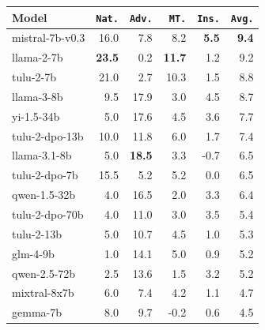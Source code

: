\documentclass[11pt]{article}
\newcommand{\natshort}{\texttt{Nat.}\xspace}
\newcommand{\advshort}{\texttt{Adv.}\xspace}
\newcommand{\mtshort}{\texttt{MT.}\xspace}
\newcommand{\insshort}{\texttt{Ins.}\xspace}
\begin{document}
\begin{table}[t!]
\small
\centering
\addtolength{\tabcolsep}{1pt} 
\begin{tabular}{@{}lrrrrr@{}}
\toprule
\textbf{Model} & \textbf{\natshort} & \textbf{\advshort} & \textbf{\mtshort}  & \textbf{\insshort} & \textbf{\texttt{Avg.}}\\
\midrule
 mistral-7b-v0.3 & 16.0             & 7.8                  & 8.2           & \textbf{5.5}    & \textbf{9.4} \\
 llama-2-7b      & \textbf{23.5}    & 0.2                  & \textbf{11.7} & 1.2             & 9.2          \\
 tulu-2-7b       & 21.0             & 2.7                  & 10.3          & 1.5             & 8.8          \\
 llama-3-8b      & 9.5              & 17.9                 & 3.0           & 4.5             & 8.7          \\
 yi-1.5-34b      & 5.0              & 17.6                 & 4.5           & 3.6             & 7.7          \\
 tulu-2-dpo-13b  & 10.0             & 11.8                 & 6.0           & 1.7             & 7.4          \\
 llama-3.1-8b    & 5.0              & \textbf{18.5}        & 3.3           & -0.7            & 6.5          \\
 tulu-2-dpo-7b   & 15.5             & 5.2                  & 5.2           & 0.0             & 6.5          \\
 qwen-1.5-32b    & 4.0              & 16.5                 & 2.0           & 3.3             & 6.4          \\
 tulu-2-dpo-70b  & 4.0              & 11.0                 & 3.0           & 3.5             & 5.4          \\
 tulu-2-13b      & 5.0              & 10.7                 & 4.5           & 1.0             & 5.3          \\
 glm-4-9b        & 1.0              & 14.1                 & 5.0           & 0.9             & 5.2          \\
 qwen-2.5-72b    & 2.5              & 13.6                 & 1.5           & 3.2             & 5.2          \\
 mixtral-8x7b    & 6.0              & 7.4                  & 4.2           & 1.1             & 4.7          \\
 gemma-7b        & 8.0              & 9.7                  & -0.2          & 0.6             & 4.5          \\

\end{tabular}
\end{table}
\end{document}
